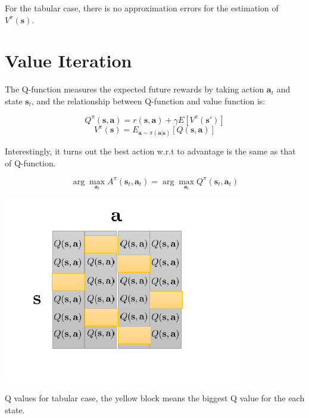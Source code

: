 \documentclass{tufte-handout}
\newcommand{\s}{\mathbf{s}}
\newcommand{\act}{\mathbf{a}}
\begin{document}
For the tabular case, there is no approximation errors for the estimation of $V^\pi(\s)$.

\section{Value Iteration}

The Q-function measures the expected future rewards by taking action $\act_t$ and state $\s_t$, and the relationship between Q-function and value function is:

\begin{equation}
\label{eq:5}
Q^\pi (\s, \act) = r(\s, \act) +\gamma E[V^\pi(\s')]
\end{equation}
\begin{equation}
\label{eq:6}
V^\pi (\s) = E_{\act \sim \pi(\act | \s)} [Q(\s, \act)]
\end{equation}

Interestingly, it turns out the best action w.r.t to advantage is the same as that of Q-function.

\begin{equation}
\label{eq:7}
\arg \max_{\act_t} A^\pi(\s_t, \act_t) = \arg \max_{\act_t} Q^\pi(\s_t, \act_t)
\end{equation}

\begin{marginfigure}
\centering
\includegraphics[width=\linewidth]{tabular-q}
\caption{Q values for tabular case, the yellow block means the biggest Q value for the each state.}
\label{fig:tabular-q}
\end{marginfigure}
\end{document}

